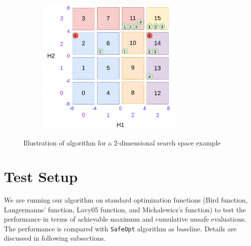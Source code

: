 \begin{figure}
\begin{subfigure}{0.45\textwidth}
		\caption{}
		\label{fig:dsbo-example-g}
	\end{subfigure}
	\begin{subfigure}{0.45\textwidth}
		\includegraphics[width=0.8\textwidth]{figures/draw/h.png}
		\caption{}
		\label{fig:dsbo-example-h}
	\end{subfigure}
	\caption{Illustration of algorithm for a 2-dimensional search space example}
	\label{fig:dsbo-example}
\end{figure}

\section{Test Setup}
We are running our algorithm on standard optimization functions (Bird function, Langermanns' function, Lavy05 function, and Michalewicz's function) to test the performance in terms of achievable maximum and cumulative unsafe evaluations. 
The performance is compared with \texttt{SafeOpt} algorithm as baseline. Details are discussed in following subsections.
